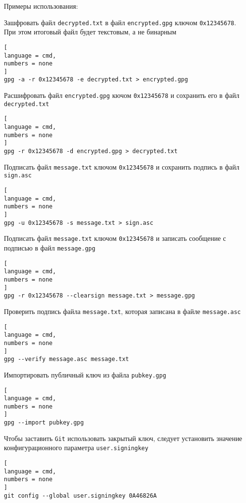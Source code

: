 \documentclass[%
	11pt,
	a4paper,
	utf8,
		]{article}
\begin{document}
Примеры использования:

Зашфровать файл \texttt{decrypted.txt} в файл \texttt{encrypted.gpg} ключом \texttt{0x12345678}. При этом итоговый файл будет текстовым, а не бинарным

\begin{lstlisting}[
language = cmd,
numbers = none
]
gpg -a -r 0x12345678 -e decrypted.txt > encrypted.gpg
\end{lstlisting}

Расшифровать файл \texttt{encrypted.gpg} кючом \texttt{0x12345678} и сохранить его в файл \texttt{decrypted.txt}

\begin{lstlisting}[
language = cmd,
numbers = none
]
gpg -r 0x12345678 -d encrypted.gpg > decrypted.txt
\end{lstlisting}

Подписать файл \texttt{message.txt} ключом \texttt{0x12345678} и сохранить подпись в файл \texttt{sign.asc}

\begin{lstlisting}[
language = cmd,
numbers = none
]
gpg -u 0x12345678 -s message.txt > sign.asc
\end{lstlisting}

Подписать файл \texttt{message.txt} ключом \texttt{0x12345678} и записать сообщение с подписью в файл \texttt{message.gpg}

\begin{lstlisting}[
language = cmd,
numbers = none
]
gpg -r 0x12345678 --clearsign message.txt > message.gpg
\end{lstlisting}

Проверить подпись файла \texttt{message.txt}, которая записана в файле \texttt{message.asc}

\begin{lstlisting}[
language = cmd,
numbers = none
]
gpg --verify message.asc message.txt
\end{lstlisting}

Импортировать публичный ключ из файла \texttt{pubkey.gpg}

\begin{lstlisting}[
language = cmd,
numbers = none
]
gpg --import pubkey.gpg
\end{lstlisting}

Чтобы заставить \texttt{Git} использовать закрытый ключ, следует установить значение конфигурационного параметра \texttt{user.signingkey}

\begin{lstlisting}[
language = cmd,
numbers = none
]
git config --global user.signingkey 0A46826A
\end{lstlisting}
\end{document}

